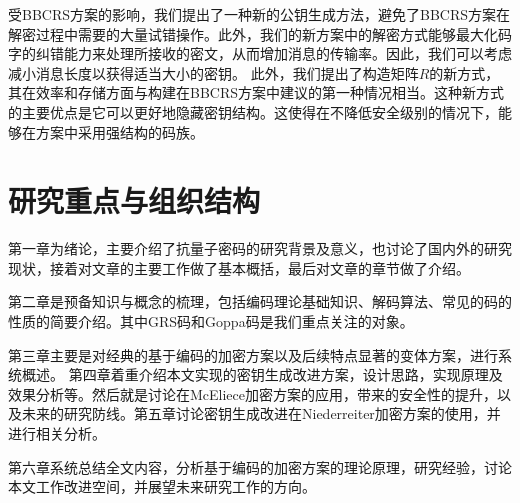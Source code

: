 受BBCRS方案的影响，我们提出了一种新的公钥生成方法，避免了BBCRS方案在解密过程中需要的大量试错操作。此外，我们的新方案中的解密方式能够最大化码字的纠错能力来处理所接收的密文，从而增加消息的传输率。因此，我们可以考虑减小消息长度以获得适当大小的密钥。 此外，我们提出了构造矩阵$R$的新方式，其在效率和存储方面与构建在BBCRS方案中建议的第一种情况相当。这种新方式的主要优点是它可以更好地隐藏密钥结构。这使得在不降低安全级别的情况下，能够在方案中采用强结构的码族。

\section{研究重点与组织结构}
第一章为绪论，主要介绍了抗量子密码的研究背景及意义，也讨论了国内外的研究现状，接着对文章的主要工作做了基本概括，最后对文章的章节做了介绍。

第二章是预备知识与概念的梳理，包括编码理论基础知识、解码算法、常见的码的性质的简要介绍。其中GRS码和Goppa码是我们重点关注的对象。

第三章主要是对经典的基于编码的加密方案以及后续特点显著的变体方案，进行系统概述。
第四章着重介绍本文实现的密钥生成改进方案，设计思路，实现原理及效果分析等。然后就是讨论在McEliece加密方案的应用，带来的安全性的提升，以及未来的研究防线。第五章讨论密钥生成改进在Niederreiter加密方案的使用，并进行相关分析。

第六章系统总结全文内容，分析基于编码的加密方案的理论原理，研究经验，讨论本文工作改进空间，并展望未来研究工作的方向。